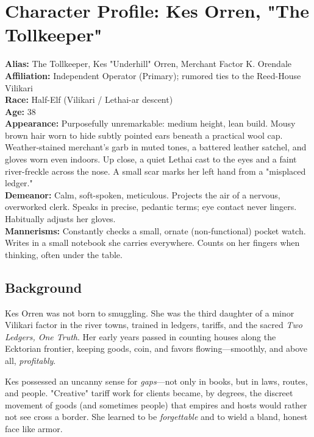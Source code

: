 \section*{Character Profile: Kes Orren, "The Tollkeeper"}

\textbf{Alias:} The Tollkeeper, Kes "Underhill" Orren, Merchant Factor K. Orendale \\
\textbf{Affiliation:} Independent Operator (Primary); rumored ties to the Reed-House Vilikari \\
\textbf{Race:} Half-Elf (Vilikari / Lethai-ar descent) \\
\textbf{Age:} 38 \\
\textbf{Appearance:} Purposefully unremarkable: medium height, lean build. Mousy brown hair worn to hide subtly pointed ears beneath a practical wool cap. Weather-stained merchant's garb in muted tones, a battered leather satchel, and gloves worn even indoors. Up close, a quiet Lethai cast to the eyes and a faint river-freckle across the nose. A small scar marks her left hand from a "misplaced ledger." \\
\textbf{Demeanor:} Calm, soft-spoken, meticulous. Projects the air of a nervous, overworked clerk. Speaks in precise, pedantic terms; eye contact never lingers. Habitually adjusts her gloves. \\
\textbf{Mannerisms:} Constantly checks a small, ornate (non-functional) pocket watch. Writes in a small notebook she carries everywhere. Counts on her fingers when thinking, often under the table.

\subsection*{Background}

Kes Orren was not born to smuggling. She was the third daughter of a minor Vilikari factor in the river towns, trained in ledgers, tariffs, and the sacred \emph{Two Ledgers, One Truth}. Her early years passed in counting houses along the Ecktorian frontier, keeping goods, coin, and favors flowing---smoothly, and above all, \emph{profitably}.

Kes possessed an uncanny sense for \emph{gaps}---not only in books, but in laws, routes, and people. "Creative" tariff work for clients became, by degrees, the discreet movement of goods (and sometimes people) that empires and hosts would rather not see cross a border. She learned to be \emph{forgettable} and to wield a bland, honest face like armor.

